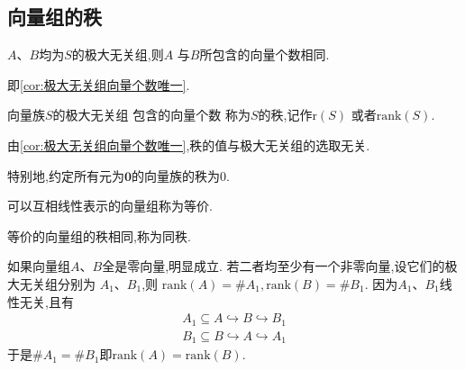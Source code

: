 \subsection{向量组的秩}
\begin{formal}
\begin{theorem}[极大无关组向量个数唯一]\label{thm:极大无关组向量个数唯一}
    $A$、$B$均为$S$的极大无关组,则$A$
    与$B$所包含的向量个数相同.
\end{theorem}
\begin{Proof}
即\cref{cor:极大无关组向量个数唯一}.
\end{Proof}
\end{formal}
\begin{formal}
\begin{definition}[秩]\label{def:秩}
    向量族$S$的极大无关组
    包含的向量个数
    称为$S$的秩,记作$\mathrm{r}\left(S\right)$
    或者$\mathrm{rank}\left(S\right)$.
\end{definition}
\end{formal}
\begin{red}
    \begin{remark}
        由\cref{cor:极大无关组向量个数唯一},秩的值与极大无关组的选取无关.
    \end{remark}
\end{red}
\begin{red}
\begin{remark}
    特别地,约定所有元为$\bm{0}$的向量族的秩为$0$.
\end{remark}
\end{red}
\begin{formal}
\begin{definition}[等价]\label{def:等价}
    可以互相线性表示的向量组称为等价.
\end{definition}
\end{formal}
\begin{formal}
\begin{theorem}[同秩]\label{thm:同秩}
    等价的向量组的秩相同,称为同秩.
\end{theorem}
\begin{Proof}
如果向量组$A$、$B$全是零向量,明显成立.
若二者均至少有一个非零向量,设它们的极大无关组分别为
$A_1$、$B_1$,则
$\mathrm{rank}\left(A\right)=\#A_1,\mathrm{rank}\left(B\right)=\#B_1$.
因为$A_1$、$B_1$线性无关,且有
\begin{align*}
    A_1\subseteq A \hookrightarrow B \hookrightarrow B_1\\
    B_1\subseteq B \hookrightarrow A \hookrightarrow A_1
\end{align*}
于是$\#A_1=\#B_1$即$\mathrm{rank}\left(A\right)=\mathrm{rank}\left(B\right).$
\end{Proof}
\end{formal}
